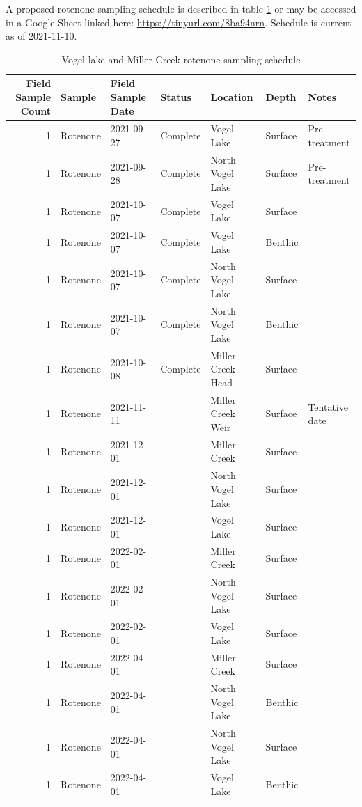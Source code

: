 \documentclass[
]{book}
\begin{document}
A proposed rotenone sampling schedule is described in table \ref{tab:sample-schedule} or may be accessed in a Google Sheet linked here: \url{https://tinyurl.com/8ba94nrn}. Schedule is current as of 2021-11-10.

\begin{table}

\caption{\label{tab:sample-schedule}Vogel lake and Miller Creek rotenone sampling schedule}
\centering
\begin{tabular}[t]{r|l|l|l|l|l|l}
\hline
Field Sample Count & Sample & Field Sample Date & Status & Location & Depth & Notes\\
\hline
1 & Rotenone & 2021-09-27 & Complete & Vogel Lake & Surface & Pre-treatment\\
\hline
1 & Rotenone & 2021-09-28 & Complete & North Vogel Lake & Surface & Pre-treatment\\
\hline
1 & Rotenone & 2021-10-07 & Complete & Vogel Lake & Surface & \\
\hline
1 & Rotenone & 2021-10-07 & Complete & Vogel Lake & Benthic & \\
\hline
1 & Rotenone & 2021-10-07 & Complete & North Vogel Lake & Surface & \\
\hline
1 & Rotenone & 2021-10-07 & Complete & North Vogel Lake & Benthic & \\
\hline
1 & Rotenone & 2021-10-08 & Complete & Miller Creek Head & Surface & \\
\hline
1 & Rotenone & 2021-11-11 &  & Miller Creek Weir & Surface & Tentative date\\
\hline
1 & Rotenone & 2021-12-01 &  & Miller Creek & Surface & \\
\hline
1 & Rotenone & 2021-12-01 &  & North Vogel Lake & Surface & \\
\hline
1 & Rotenone & 2021-12-01 &  & Vogel Lake & Surface & \\
\hline
1 & Rotenone & 2022-02-01 &  & Miller Creek & Surface & \\
\hline
1 & Rotenone & 2022-02-01 &  & North Vogel Lake & Surface & \\
\hline
1 & Rotenone & 2022-02-01 &  & Vogel Lake & Surface & \\
\hline
1 & Rotenone & 2022-04-01 &  & Miller Creek & Surface & \\
\hline
1 & Rotenone & 2022-04-01 &  & North Vogel Lake & Benthic & \\
\hline
1 & Rotenone & 2022-04-01 &  & North Vogel Lake & Surface & \\
\hline
1 & Rotenone & 2022-04-01 &  & Vogel Lake & Benthic & \\

\end{tabular}
\end{table}
\end{document}
